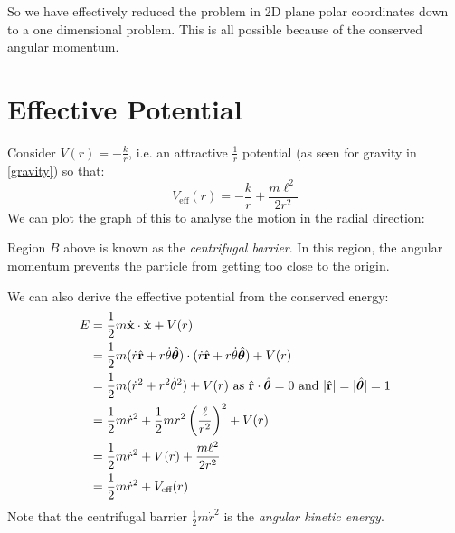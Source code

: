 \documentclass[../main.tex]{subfiles}
\begin{document}
So we have effectively reduced the problem in 2D plane polar coordinates down to a one dimensional problem.
This is all possible because of the conserved angular momentum.
\section{Effective Potential}
Consider $V(r) = -\frac{k}{r}$, i.e. an attractive $\frac{1}{r}$ potential (as seen for gravity in \cref{gravity}) so that:
\[
  V_{\text{eff}}(r) = -\frac{k}{r} + \frac{m\ell^2}{2r^2}
\]
We can plot the graph of this to analyse the motion in the radial direction:
\begin{center}
\end{center}
Region $B$ above is known as the \textit{centrifugal barrier}.
In this region, the angular momentum prevents the particle from getting too close to the origin.

We can also derive the effective potential from the conserved energy:
\begin{align*}
  E &= \frac{1}{2} m \dot{\mathbf{\bm{x}}} \cdot \dot{\mathbf{\bm{x}}} + V(r) \\
    &= \frac{1}{2} m (\dot{r} \hat{\mathbf{\bm{r}}} + r \dot{\theta} \hat{\mathbf{\bm{\theta}}}) \cdot (\dot{r} \hat{\mathbf{\bm{r}}} + r \dot{\theta} \hat{\mathbf{\bm{\theta}}}) + V(r) \\
    &= \frac{1}{2} m (\dot{r}^2 + r^2 \dot{\theta}^2) + V(r) \text{ as $\hat{\mathbf{\bm{r}}} \cdot \hat{\mathbf{\bm{\theta}}} = 0$ and $|\hat{\mathbf{\bm{r}}}| = |\hat{\mathbf{\bm{\theta}}}| = 1$}\\
    &= \frac{1}{2} m \dot{r}^2 + \frac{1}{2} m r^2 \left(\frac{\ell}{r^2}\right)^2 + V(r) \\
    &= \frac{1}{2} m \dot{r}^2 + V(r) + \frac{m\ell^2}{2r^2} \\
    &= \frac{1}{2} m \dot{r}^2 + V_{\text{eff}}(r)
\end{align*}
Note that the centrifugal barrier $\frac{1}{2}m\dot{r}^2$ is the \textit{angular kinetic energy}.
\end{document}
